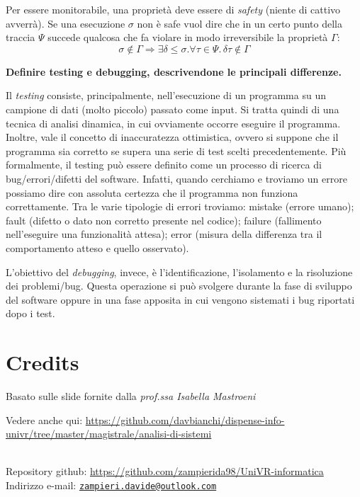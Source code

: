 \documentclass[a4paper,oneside,titlepage]{book}
\newcommand{\mail}[1]{\href{mailto:#1}{\texttt{#1}}}
\begin{document}
Per essere monitorabile, una proprietà deve essere di \textit{safety} (niente di cattivo avverrà). Se una esecuzione $\sigma$ non è safe vuol dire che in un certo punto della traccia $\Psi$ succede qualcosa che fa violare in modo irreversibile la proprietà $\Gamma$:
\[ \sigma \notin \Gamma \Rightarrow \exists \delta \leq \sigma. \forall \tau \in \Psi. \, \delta \tau \notin \Gamma \]

\noindent
\textbf{Definire testing e debugging, descrivendone le principali differenze.}

Il \textit{testing} consiste, principalmente, nell'esecuzione di un programma su un campione di dati (molto piccolo) passato come input. Si tratta quindi di una tecnica di analisi dinamica, in cui ovviamente occorre eseguire il programma. Inoltre, vale il concetto di inaccuratezza ottimistica, ovvero si suppone che il programma sia corretto se supera una serie di test scelti precedentemente. Più formalmente, il testing può essere definito come un processo di ricerca di bug/errori/difetti del software. Infatti, quando cerchiamo e troviamo un errore possiamo dire con assoluta certezza che il programma non funziona correttamente. Tra le varie tipologie di errori troviamo: mistake (errore umano); fault (difetto o dato non corretto presente nel codice); failure (fallimento nell'eseguire una funzionalità attesa); error (misura della differenza tra il comportamento atteso e quello osservato).

L'obiettivo del \textit{debugging}, invece, è l'identificazione, l'isolamento e la risoluzione dei problemi/bug. Questa operazione si può svolgere durante la fase di sviluppo del software oppure in una fase apposita in cui vengono sistemati i bug riportati dopo i test.


\backmatter
\chapter{Credits}
Basato sulle slide fornite dalla \textit{prof.ssa Isabella Mastroeni}

\noindent
Vedere anche qui: \url{https://github.com/davbianchi/dispense-info-univr/tree/master/magistrale/analisi-di-sistemi}

\noindent
\\
Repository github: \url{https://github.com/zampierida98/UniVR-informatica} \\
Indirizzo e-mail: \mail{zampieri.davide@outlook.com}
\end{document}
